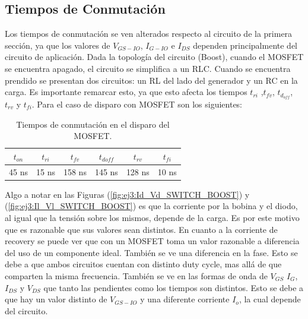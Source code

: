\subsection{Tiempos de Conmutación}
Los tiempos de conmutación se ven alterados respecto al circuito de la primera sección, ya que los valores de $V_{GS-IO}$, $I_{G-IO}$ e $I_{DS}$ dependen principalmente del circuito de aplicación. Dada la topología del circuito (Boost), cuando el MOSFET se encuentra apagado, el circuito se simplifica a un RLC. Cuando se encuentra prendido se presentan dos circuitos: un RL del lado del generador y un RC en la carga. Es importante remarcar esto, ya que esto afecta los tiempos $t_{ri}$ ,$t_{fv}$, $t_{d_{off}}$, $t_{rv}$ y  $t_{fi}$. Para el caso de disparo con MOSFET son los siguientes:
\begin{table}[H]
\center
\begin{tabular}{cccccc}
\hline
$t_{on}$ & $t_{ri}$ & $t_{fv}$ & $t_{doff}$ & $t_{rv}$ & $t_{fi}$          \\	\hline
45 ns       & 15 ns       & 158 ns      & 145 ns        & 128 ns      & 10 ns     \\	 	\hline
\end{tabular}
\caption{Tiempos de conmutación en el disparo del MOSFET.}
\end{table}
\vspace*{-0.25cm}
Algo a notar en las Figuras (\ref{fig:ej3:Id_Vd_SWITCH_BOOST}) y (\ref{fig:ej3:Il_Vl_SWITCH_BOOST}) es que la corriente por la bobina y el diodo, al igual que la tensión sobre los mismos, depende de la carga. Es por este motivo que es razonable que sus valores sean distintos. En cuanto a la corriente de recovery se puede ver que con un MOSFET toma un valor razonable a diferencia del uso de un componente ideal. También se ve una diferencia en la fase. Esto se debe a que ambos circuitos cuentan con distinto duty cycle, mas allá de que comparten la misma frecuencia. 
También se ve en las formas de onda de $V_{GS}$ $I_G$, $I_{DS}$ y $V_{DS}$ que tanto las pendientes como los tiempos son distintos. Esto se debe a que hay un valor distinto de $V_{GS-IO}$ y una diferente corriente $I_o$, la cual depende del circuito.
